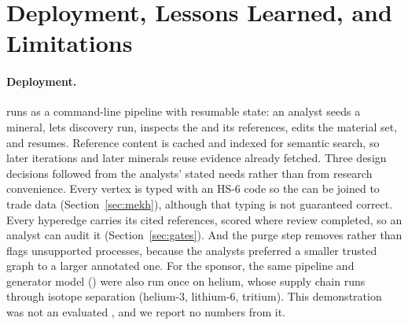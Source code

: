 \section{Deployment, Lessons Learned, and Limitations}
\label{sec:lessons}

\paragraph{Deployment.}
\process{} runs as a command-line pipeline with resumable state: an analyst seeds a mineral, lets discovery run, inspects the \tool{} and its references, edits the material set, and resumes. Reference content is cached and indexed for semantic search, so later iterations and later minerals reuse evidence already fetched. Three design decisions followed from the analysts' stated needs rather than from research convenience. Every vertex is typed with an HS-6 code so the \tool{} can be joined to trade data (Section~\ref{sec:mekh}), although that typing is not guaranteed correct. Every hyperedge carries its cited references, scored where review completed, so an analyst can audit it (Section~\ref{sec:gates}). And the purge step removes rather than flags unsupported processes, because the analysts preferred a smaller trusted graph to a larger annotated one. For the sponsor, the same pipeline and generator model (\GenModel{}) were also run once on helium, whose supply chain runs through isotope separation (helium-3, lithium-6, tritium). This demonstration was not an evaluated \tool{}, and we report no numbers from it.

